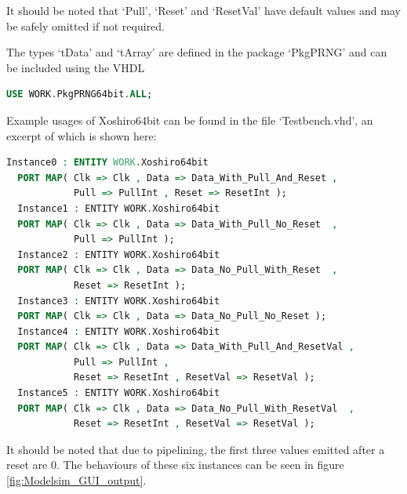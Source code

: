 \documentclass{article}
\begin{document}
It should be noted that `Pull', `Reset' and `ResetVal' have default values and may be safely omitted if not required.

The types `tData' and `tArray' are defined in the package `PkgPRNG' and can be included using the VHDL

\begin{minipage}{1.0\textwidth}
\centering
\begin{lstlisting}[language=VHDL, label=lst:PkgPRNG64bit]
USE WORK.PkgPRNG64bit.ALL;
\end{lstlisting}
\end{minipage}

Example usages of Xoshiro64bit can be found in the file `Testbench.vhd', an excerpt of which is shown here:

\begin{minipage}{1.0\textwidth}
\centering
\begin{lstlisting}[language=VHDL, label=lst:Xoshiro64bit_instance]
  Instance0 : ENTITY WORK.Xoshiro64bit 
  PORT MAP( Clk => Clk , Data => Data_With_Pull_And_Reset , 
            Pull => PullInt , Reset => ResetInt );
  Instance1 : ENTITY WORK.Xoshiro64bit 
  PORT MAP( Clk => Clk , Data => Data_With_Pull_No_Reset  , 
            Pull => PullInt );
  Instance2 : ENTITY WORK.Xoshiro64bit 
  PORT MAP( Clk => Clk , Data => Data_No_Pull_With_Reset  ,                  
            Reset => ResetInt );
  Instance3 : ENTITY WORK.Xoshiro64bit 
  PORT MAP( Clk => Clk , Data => Data_No_Pull_No_Reset );
  Instance4 : ENTITY WORK.Xoshiro64bit 
  PORT MAP( Clk => Clk , Data => Data_With_Pull_And_ResetVal , 
            Pull => PullInt , 
            Reset => ResetInt , ResetVal => ResetVal );
  Instance5 : ENTITY WORK.Xoshiro64bit 
  PORT MAP( Clk => Clk , Data => Data_No_Pull_With_ResetVal  ,                   
            Reset => ResetInt , ResetVal => ResetVal );
\end{lstlisting}
\end{minipage}

It should be noted that due to pipelining, the first three values emitted after a reset are 0. The behaviours of these six instances can be seen in figure \ref{fig:Modelsim_GUI_output}.
\end{document}
